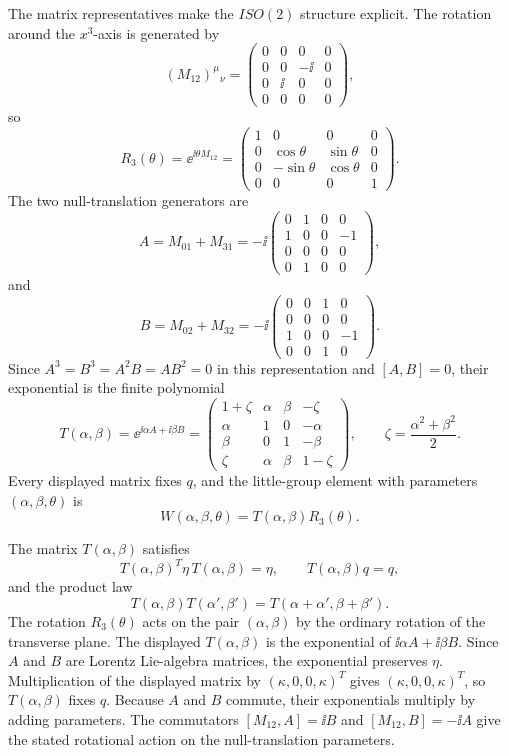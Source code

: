 The matrix representatives make the \(ISO(2)\) structure explicit. The
rotation around the \(x^3\)-axis is generated by
\[
  (M_{12})^\mu{}_\nu
  =
  \begin{pmatrix}
    0&0&0&0\\
    0&0&-\ii&0\\
    0&\ii&0&0\\
    0&0&0&0
  \end{pmatrix},
\]
so
\[
  R_3(\theta)
  =
  \ee^{\ii\theta M_{12}}
  =
  \begin{pmatrix}
    1&0&0&0\\
    0&\cos\theta&\sin\theta&0\\
    0&-\sin\theta&\cos\theta&0\\
    0&0&0&1
  \end{pmatrix}.
\]
The two null-translation generators are
\[
  A=M_{01}+M_{31}
  =
  -\ii
  \begin{pmatrix}
    0&1&0&0\\
    1&0&0&-1\\
    0&0&0&0\\
    0&1&0&0
  \end{pmatrix},
\]
and
\[
  B=M_{02}+M_{32}
  =
  -\ii
  \begin{pmatrix}
    0&0&1&0\\
    0&0&0&0\\
    1&0&0&-1\\
    0&0&1&0
  \end{pmatrix}.
\]
Since \(A^3=B^3=A^2B=AB^2=0\) in this representation and
\([A,B]=0\), their exponential is the finite polynomial
\[
  T(\alpha,\beta)
  =
  \ee^{\ii\alpha A+\ii\beta B}
  =
  \begin{pmatrix}
    1+\zeta&\alpha&\beta&-\zeta\\
    \alpha&1&0&-\alpha\\
    \beta&0&1&-\beta\\
    \zeta&\alpha&\beta&1-\zeta
  \end{pmatrix},
  \qquad
  \zeta=\frac{\alpha^2+\beta^2}{2}.
\]
Every displayed matrix fixes \(q\), and the little-group element with
parameters \((\alpha,\beta,\theta)\) is
\[
  W(\alpha,\beta,\theta)
  =
  T(\alpha,\beta)R_3(\theta).
\]

The matrix \(T(\alpha,\beta)\) satisfies
\[
  T(\alpha,\beta)^T\eta\,T(\alpha,\beta)=\eta,\qquad
  T(\alpha,\beta)q=q ,
\]
and the product law
\[
  T(\alpha,\beta)T(\alpha',\beta')
  =
  T(\alpha+\alpha',\beta+\beta').
\]
The rotation \(R_3(\theta)\) acts on the pair \((\alpha,\beta)\) by the
ordinary rotation of the transverse plane.
The displayed \(T(\alpha,\beta)\) is the exponential of
\(\ii\alpha A+\ii\beta B\).  Since \(A\) and \(B\) are Lorentz Lie-algebra
matrices, the exponential preserves \(\eta\).  Multiplication of the displayed
matrix by \((\kappa,0,0,\kappa)^T\) gives \((\kappa,0,0,\kappa)^T\), so
\(T(\alpha,\beta)\) fixes \(q\).  Because \(A\) and \(B\) commute, their
exponentials multiply by adding parameters.  The commutators
\([M_{12},A]=\ii B\) and \([M_{12},B]=-\ii A\) give the stated rotational
action on the null-translation parameters.


